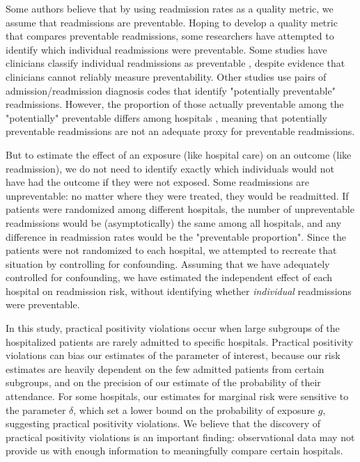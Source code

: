 \documentclass[]{article}\usepackage[]{graphicx}\usepackage[]{color}
\begin{document}
Some authors \supercite{kansagara_risk_2011, clarke_are_1990} believe that by using readmission rates as a quality metric, we assume that readmissions are preventable. Hoping to develop a quality metric that compares preventable readmissions, some researchers have attempted to identify which individual readmissions were preventable. Some studies have clinicians classify individual readmissions as preventable \supercite{witherington_communication_2008, stanley_review_2008, ruiz_factors_2008}, despite evidence that clinicians cannot reliably measure preventability.\supercite{van_walraven_incidence_2011} Other studies use pairs of admission/readmission diagnosis codes that identify "potentially preventable" readmissions.\supercite{halfon_validation_2006} However, the proportion of those actually preventable among the "potentially" preventable differs among hospitals \supercite{van_walraven_proportion_2011}, meaning that potentially preventable readmissions are not an adequate proxy for preventable readmissions.\supercite{clarke_are_1990}

But to estimate the effect of an exposure (like hospital care) on an outcome (like readmission), we do not need to identify exactly which individuals would not have had the outcome if they were not exposed.\supercite{hernan_causal_2014}  Some readmissions are unpreventable: no matter where they were treated, they would be readmitted. If patients were randomized among different hospitals, the number of unpreventable readmissions would be (asymptotically) the same among all hospitals, and any difference in readmission rates would be the "preventable proportion". Since the patients were not randomized to each hospital, we attempted to recreate that situation by controlling for confounding. Assuming that we have adequately controlled for confounding, we have estimated the independent effect of each hospital on readmission risk, without identifying whether \emph{individual} readmissions were preventable.

In this study, practical positivity violations occur when large subgroups of the hospitalized patients are rarely admitted to specific hospitals. Practical positivity violations can bias our estimates of the parameter of interest, because our risk estimates are heavily dependent on the few admitted patients from certain subgroups, and on the precision of our estimate of the probability of their attendance. For some hospitals, our estimates for marginal risk were sensitive to the parameter $\delta$, which set a lower bound on the probability of exposure $g$, suggesting practical positivity violations. We believe that the discovery of practical positivity violations is an important finding: observational data may not provide us with enough information to meaningfully compare certain hospitals.
\end{document}
